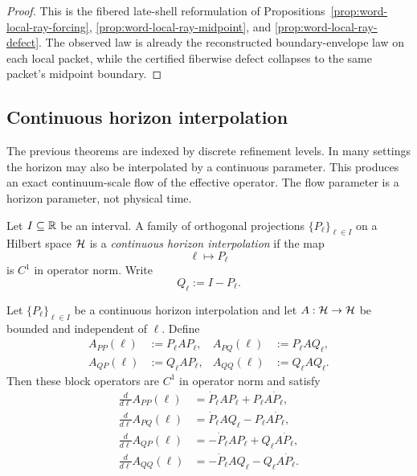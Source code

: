 \begin{proof}
This is the fibered late-shell reformulation of
Propositions~\ref{prop:word-local-ray-forcing},
\ref{prop:word-local-ray-midpoint}, and
\ref{prop:word-local-ray-defect}. The observed law is already the reconstructed
boundary-envelope law on each local packet, while the certified fiberwise
defect collapses to the same packet's midpoint boundary.
\end{proof}

\subsection{Continuous horizon interpolation}

The previous theorems are indexed by discrete refinement levels. In many
settings the horizon may also be interpolated by a continuous parameter. This
produces an exact continuum-scale flow of the effective operator. The flow
parameter is a horizon parameter, not physical time.

\begin{definition}
\label{def:continuous-horizon-interpolation}
Let $I\subseteq \mathbb{R}$ be an interval. A family of orthogonal projections
$\{P_\ell\}_{\ell\in I}$ on a Hilbert space $\mathcal{H}$ is a
\emph{continuous horizon interpolation} if the map
\[
\ell\longmapsto P_\ell
\]
is $C^1$ in operator norm. Write
\[
Q_\ell:=I-P_\ell.
\]
\end{definition}

\begin{lemma}
\label{lem:continuous-block-derivatives}
Let $\{P_\ell\}_{\ell\in I}$ be a continuous horizon interpolation and let
$A:\mathcal{H}\to\mathcal{H}$ be bounded and independent of $\ell$. Define
\begin{align*}
A_{PP}(\ell)&:=P_\ell A P_\ell, &
A_{PQ}(\ell)&:=P_\ell A Q_\ell, \\
A_{QP}(\ell)&:=Q_\ell A P_\ell, &
A_{QQ}(\ell)&:=Q_\ell A Q_\ell.
\end{align*}
Then these block operators are $C^1$ in operator norm and satisfy
\begin{align*}
\frac{d}{d\ell}A_{PP}(\ell)
&=
\dot P_\ell A P_\ell + P_\ell A \dot P_\ell, \\
\frac{d}{d\ell}A_{PQ}(\ell)
&=
\dot P_\ell A Q_\ell - P_\ell A \dot P_\ell, \\
\frac{d}{d\ell}A_{QP}(\ell)
&=
-\dot P_\ell A P_\ell + Q_\ell A \dot P_\ell, \\
\frac{d}{d\ell}A_{QQ}(\ell)
&=
-\dot P_\ell A Q_\ell - Q_\ell A \dot P_\ell.
\end{align*}
\end{lemma}

